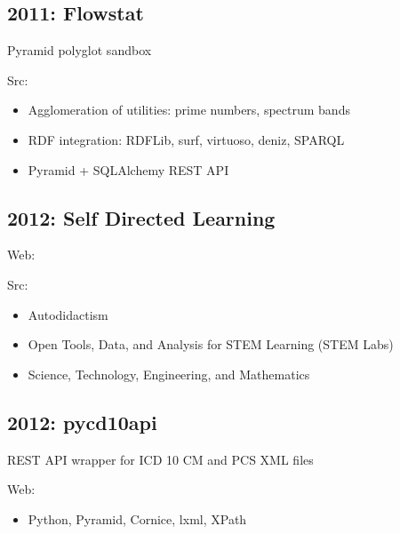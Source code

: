 \documentclass[letter,,openany,oneside,english]{sphinxhowto}
\begin{document}
\subsection{2011: Flowstat}
\label{\detokenize{resume:flowstat}}
\begin{DUlineblock}{0em}
\item[] Pyramid polyglot sandbox
\item[] Src: 
\end{DUlineblock}
\begin{itemize}
\item {} 
Agglomeration of utilities: prime numbers, spectrum bands

\item {} 
RDF integration: RDFLib, surf, virtuoso, deniz, SPARQL

\item {} 
Pyramid + SQLAlchemy REST API

\end{itemize}


\subsection{2012: Self Directed Learning}
\label{\detokenize{resume:self-directed-learning}}
\begin{DUlineblock}{0em}
\item[] Web: 
\item[] Src: 
\end{DUlineblock}
\begin{itemize}
\item {} 
Autodidactism

\item {} 
Open Tools, Data, and Analysis for STEM Learning (\sphinxquotedblleft{}STEM Labs\sphinxquotedblright{})

\item {} 
Science, Technology, Engineering, and Mathematics

\end{itemize}


\subsection{2012: pycd10api}
\label{\detokenize{resume:pycd10api}}
\begin{DUlineblock}{0em}
\item[] REST API wrapper for ICD 10 CM and PCS XML files
\item[] Web: 
\end{DUlineblock}
\begin{itemize}
\item {} 
Python, Pyramid, Cornice, lxml, XPath

\end{itemize}
\end{document}
